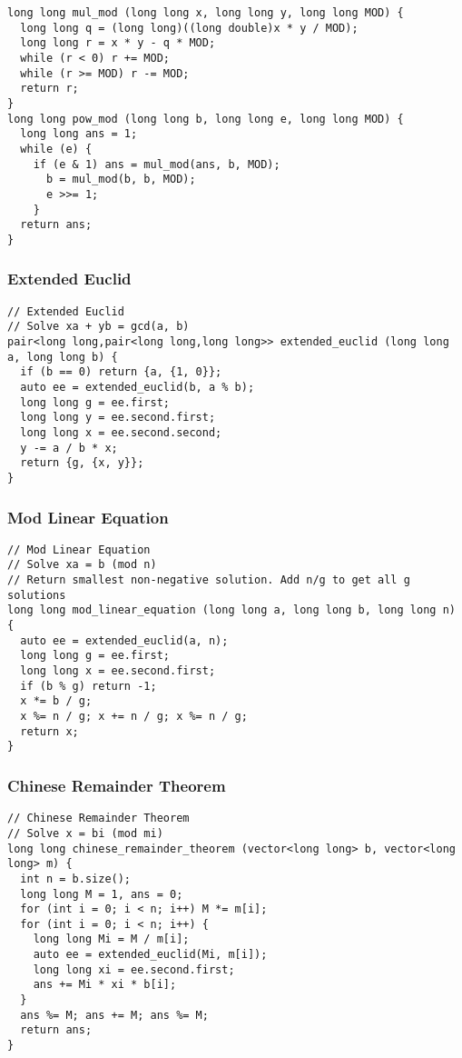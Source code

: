 \documentclass[10pt,landscape]{article}
\begin{document}
\begin{multicols}{2}
\begin{lstlisting}
long long mul_mod (long long x, long long y, long long MOD) {
  long long q = (long long)((long double)x * y / MOD);
  long long r = x * y - q * MOD;
  while (r < 0) r += MOD;
  while (r >= MOD) r -= MOD;
  return r;
}
long long pow_mod (long long b, long long e, long long MOD) {
  long long ans = 1;
  while (e) {
    if (e & 1) ans = mul_mod(ans, b, MOD);
      b = mul_mod(b, b, MOD);
      e >>= 1;
    }
  return ans;
}
\end{lstlisting}
\subsubsection{Extended Euclid}
\begin{lstlisting}
// Extended Euclid
// Solve xa + yb = gcd(a, b)
pair<long long,pair<long long,long long>> extended_euclid (long long a, long long b) {
  if (b == 0) return {a, {1, 0}};
  auto ee = extended_euclid(b, a % b);
  long long g = ee.first;
  long long y = ee.second.first;
  long long x = ee.second.second;
  y -= a / b * x;
  return {g, {x, y}};
}
\end{lstlisting}
\subsubsection{Mod Linear Equation}
\begin{lstlisting}
// Mod Linear Equation
// Solve xa = b (mod n)
// Return smallest non-negative solution. Add n/g to get all g solutions
long long mod_linear_equation (long long a, long long b, long long n) {
  auto ee = extended_euclid(a, n);
  long long g = ee.first;
  long long x = ee.second.first;
  if (b % g) return -1;
  x *= b / g;
  x %= n / g; x += n / g; x %= n / g;
  return x;
}
\end{lstlisting}
\subsubsection{Chinese Remainder Theorem}
\begin{lstlisting}
// Chinese Remainder Theorem
// Solve x = bi (mod mi)
long long chinese_remainder_theorem (vector<long long> b, vector<long long> m) {
  int n = b.size();
  long long M = 1, ans = 0;
  for (int i = 0; i < n; i++) M *= m[i];
  for (int i = 0; i < n; i++) {
    long long Mi = M / m[i];
    auto ee = extended_euclid(Mi, m[i]);
    long long xi = ee.second.first;
    ans += Mi * xi * b[i];
  }
  ans %= M; ans += M; ans %= M;
  return ans;
}
\end{lstlisting}

\end{multicols}
\end{document}
